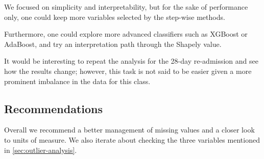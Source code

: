 We focused on simplicity and interpretability, but for the sake of performance only, one could keep more variables selected by the step-wise methods.

Furthermore, one could explore more advanced classifiers such as XGBoost or AdaBoost, and try an interpretation path through the Shapely value.

It would be interesting to repeat the analysis for the 28-day re-admission and see how the results change; however, this task is not said to be easier given a more prominent imbalance in the data for this class.

\subsection{Recommendations}

Overall we recommend a better management of missing values and a closer look to units of measure. We also iterate about checking the three variables mentioned in \autoref{sec:outlier-analysis}.
